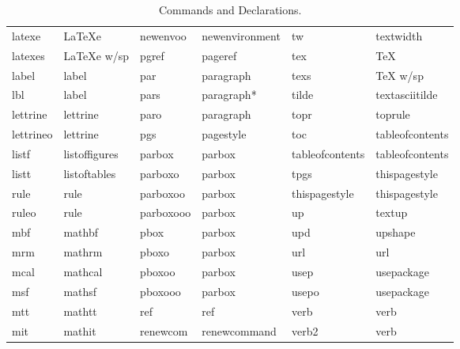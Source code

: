 \documentclass[letterpaper,11pt]{article}
\begin{document}
\begin{table}[H]
{\begin{tabular}{llllll}
latexe           & LaTeXe            & newenvoo   & newenvironment & tw              & textwidth \\
latexes          & LaTeXe w/sp       & pgref      & pageref        & tex             & TeX \\
label            & label             & par        & paragraph      & texs            & TeX w/sp \\
lbl              & label             & pars       & paragraph*     & tilde           & textasciitilde \\
lettrine         & lettrine          & paro       & paragraph      & topr            & toprule \\
lettrineo        & lettrine          & pgs        & pagestyle      & toc             & tableofcontents \\
listf            & listoffigures     & parbox     & parbox         & tableofcontents & tableofcontents \\
listt            & listoftables      & parboxo    & parbox         & tpgs            & thispagestyle \\
rule             & rule              & parboxoo   & parbox         & thispagestyle   & thispagestyle \\
ruleo            & rule              & parboxooo  & parbox         & up              & textup \\
mbf              & mathbf            & pbox       & parbox         & upd             & upshape \\
mrm              & mathrm            & pboxo      & parbox         & url             & url \\
mcal             & mathcal           & pboxoo     & parbox         & usep            & usepackage \\
msf              & mathsf            & pboxooo    & parbox         & usepo           & usepackage \\
mtt              & mathtt            & ref        & ref            & verb            & verb \\ 
mit              & mathit            & renewcom   & renewcommand   & verb2           & verb \\
\end{tabular}
}
\caption{Commands and Declarations.}
\label{tbl:commands}
\end{table}
\end{document}
